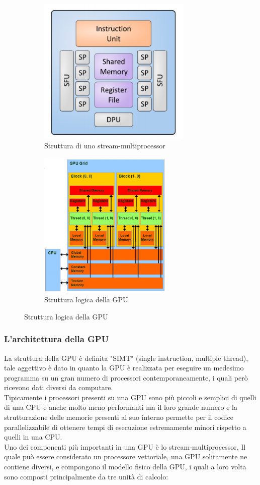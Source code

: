 \documentclass[10pt,a4paper]{article}
\begin{document}
\begin{figure}[h!]
  \centering
  \begin{subfigure}[t]{0.45\linewidth}
  	\centering
    \includegraphics[height=200pt]{SM.png}
    \caption*{Struttura di uno stream-multiprocessor}
  \end{subfigure}
  \begin{subfigure}[t]{0.45\linewidth}
  	\centering
    \includegraphics[height=200pt]{LogicModel.png}
    \caption*{Struttura logica della GPU}
  \end{subfigure}
  \label{fig:graph1}
\end{figure}



\subsubsection{L'architettura della GPU}
La struttura della GPU è definita "SIMT" (single instruction, multiple thread), tale aggettivo è dato in quanto la GPU è realizzata per eseguire un medesimo programma su un gran numero di processori contemporaneamente, i quali però ricevono dati diversi da computare.\\ Tipicamente i processori presenti su una GPU sono più piccoli e semplici di quelli di una CPU e anche molto meno performanti ma il loro grande numero e la strutturazione delle memorie presenti al suo interno permette per il codice parallelizzabile di ottenere tempi di esecuzione estremamente minori rispetto a quelli in una CPU.\\
Uno dei componenti più importanti in una GPU è lo stream-multiprocessor, Il quale  può essere considerato un processore vettoriale, una GPU solitamente ne contiene diversi, e compongono il modello fisico della GPU, i quali a loro volta sono composti principalmente da tre  unità di calcolo: 
\end{document}
